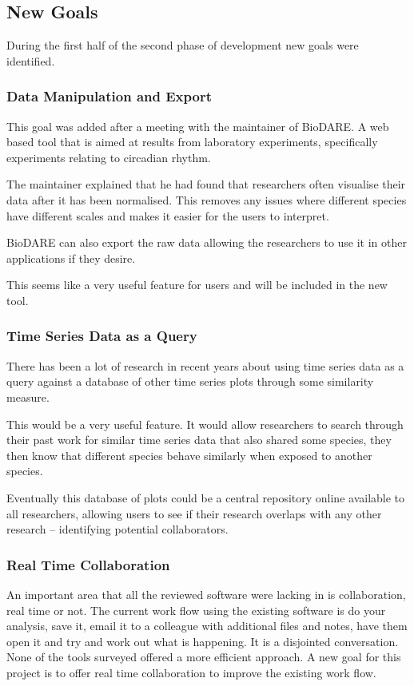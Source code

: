 \subsection{New Goals}
During the first half of the second phase of development new goals were identified.

\subsubsection{Data Manipulation and Export}

This goal was added after a meeting with the maintainer of BioDARE.  A web based tool that is aimed at results from laboratory experiments, specifically experiments relating to circadian rhythm.

The maintainer explained that he had found that researchers often visualise their data after it has been normalised.  This removes any issues where different species have different scales and makes it easier for the users to interpret.

BioDARE can also export the raw data allowing the researchers to use it in other applications if they desire.

This seems like a very useful feature for users and will be included in the new tool.

\subsubsection{Time Series Data as a Query}

There has been a lot of research in recent years about using time series data as a query against a database of other time series plots through some similarity measure.

This would be a very useful feature.  It would allow researchers to search through their past work for similar time series data that also shared some species, they then know that different species behave similarly when exposed to another species.

Eventually this database of plots could be a central repository online available to all researchers, allowing users to see if their research overlaps with any other research -- identifying potential collaborators.

\subsubsection{Real Time Collaboration}

An important area that all the reviewed software were lacking in is collaboration, real time or not.  The current work flow using the existing software is do your analysis, save it, email it to a colleague with additional files and notes, have them open it and try and work out what is happening.  It is a disjointed conversation.  None of the tools surveyed offered a more efficient approach.  A new goal for this project is to offer real time collaboration to improve the existing work flow.

